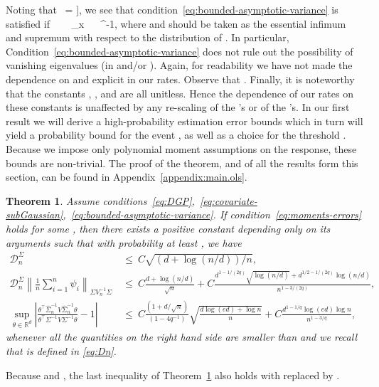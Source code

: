\documentclass{article}
\newtheorem{theorem}{Theorem}
\begin{document}
Noting that
\ = \left\right],
\]
we see that condition~\ref{eq:bounded-asymptotic-variance} is satisfied if
\ ~\le~ \sup_{x} ~\le~ \underline{\lambda}^{-1},
\]
where   and   should be taken as the essential infimum and supremum with respect to the distribution of  .
In particular, Condition~\ref{eq:bounded-asymptotic-variance} does not rule out the possibility of vanishing eigenvalues (in   and/or  ). Again, for readability we have not made the dependence on   and   explicit in our rates. Observe that  .
Finally, it is noteworthy that the constants  ,  , and   are all unitless. Hence the dependence of our rates on these constants is unaffected by any re-scaling of the  's or of the  's.
In our first result we will derive a high-probability estimation error bounds which in turn will yield a probability bound for the event  , as well as a choice for the threshold  . Because we impose only polynomial moment assumptions on the response, these bounds are non-trivial. The proof of the theorem, and of all the results form this section, can be found
in Appendix~\ref{appendix:main.ols}.
\begin{theorem}\label{thm:main-rates-thm-OLS-independence}
Assume conditions~\ref{eq:DGP},~\ref{eq:covariate-subGaussian},~\ref{eq:bounded-asymptotic-variance}. If condition~\ref{eq:moments-errors} holds for some  , then there exists a positive constant   depending only on its arguments such that with probability at least  , we have
\begin{equation}\label{eq:main-quantity-bounds}
\begin{split}
\mathcal{D}_n^{\Sigma} ~&\le~ C\sqrt{(d + \log(n/d))/n},\\ \mathcal{D}_n^{\Sigma}\left\|\frac{1}{n}\sum_{i=1}^n \psi_i\right\|_{\Sigma V_n^{-1}\Sigma} ~&\le~ C\frac{d + \log(n/d)}{\sqrt{n}}
+ C\frac{d^{1-1/(2q)}\sqrt{\log(n/d)} + d^{1/2 - 1/(2q)}\log(n/d)}{n^{1-3/(2q)}},\\ \sup_{\theta\in\mathbb{R}^d}\left|\frac{\theta^{\top}\widehat{\Sigma}^{-1}_n\widehat{V}\widehat{\Sigma}_n^{-1}\theta}{\theta^{\top}\Sigma^{-1}V\Sigma^{-1}\theta} - 1\right| ~&\le~ C\frac{(1 + d/\sqrt{n})}{(1-4q^{-1})}\sqrt{\frac{d\log(ed) + \log n}{n}}
+ C\frac{d^{1-1/q}\log(ed)\log n}{n^{1-3/q}},
\end{split}
\end{equation}
whenever all the quantities on the right hand side are smaller than   and we recall that   is defined in \eqref{eq:Dn}.
\end{theorem}
Because   and  , the last inequality of Theorem~\ref{thm:main-rates-thm-OLS-independence} also holds with   replaced by  .
\end{document}
